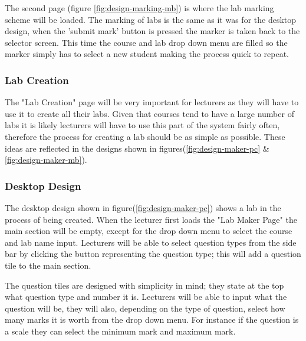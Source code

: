 \documentclass[12pt]{article}  %
\begin{document}
\noindent The second page (figure \ref{fig:design-marking-mb}) is where the lab marking scheme will be loaded. The marking of labs is the same as it was for the desktop design, when the 'submit mark' button is pressed the marker is taken back to the selector screen. This time the course and lab drop down menu are filled so the marker simply has to select a new student making the process quick to repeat. 





\subsubsection{Lab Creation}
The "Lab Creation" page will be very important for lecturers as they will have to use it to create all their labs. Given that courses tend to have a large number of labs it is likely lecturers will have to use this part of the system fairly often, therefore the process for creating a lab should be as simple as possible. These ideas are reflected in the designs shown in figures(\ref{fig:design-maker-pc} \& \ref{fig:design-maker-mb}).

\subsubsection*{Desktop Design}

The desktop design shown in figure(\ref{fig:design-maker-pc}) shows a lab in the process of being created. When the lecturer first loads the "Lab Maker Page" the main section will be empty, except for the drop down menu to select the course and lab name input. Lecturers will be able to select question types from the side bar by clicking the button representing the question type; this will add a question tile to the main section. 

The question tiles are designed with simplicity in mind; they state at the top what question type and  number it is. Lecturers will be able to input what the question will be, they will also, depending on the type of question, select how many marks it is worth from the drop down menu. For instance if the question is a scale they can select the minimum mark and maximum mark. 
\end{document}
